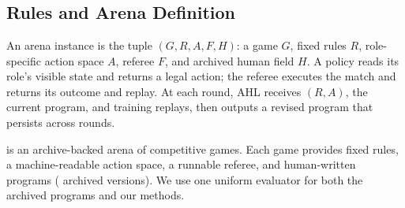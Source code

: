 \section{\benchname}
\label{sec:benchmark}

\subsection{Rules and Arena Definition}
\label{sec:arena-formulation}

An arena instance is the tuple $(G,R,A,F,H)$: a game $G$, fixed rules $R$,
role-specific action space $A$, referee $F$, and archived human field $H$.
A policy reads its role's visible state and returns a legal action; the referee executes
the match and returns its outcome and replay. At each round, AHL receives $(R,A)$, the
current program, and training replays, then outputs a revised program that persists
across rounds.

\benchname is an archive-backed arena of  competitive games. Each game
provides fixed rules, a machine-readable action space, a runnable referee, and
human-written programs ( archived versions). We use one uniform evaluator
for both the archived programs and our methods.

